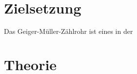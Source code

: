 \section{Zielsetzung}
\label{sec:ziel}
Das Geiger-Müller-Zählrohr ist eines in der

\section{Theorie}
\label{sec:Theorie}

